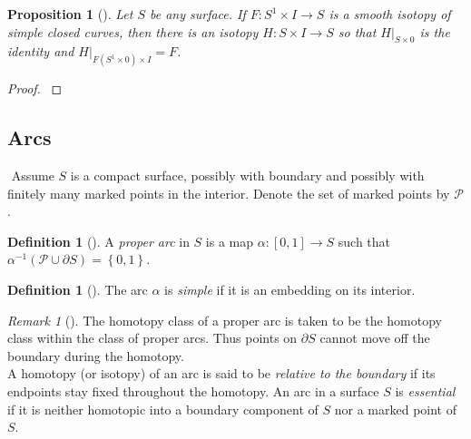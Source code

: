 \documentclass[reqno]{amsart}
\newtheorem{proposition}[theorem]{Proposition}
\theoremstyle{definition}
\newtheorem{definition}[theorem]{Definition}
\theoremstyle{remark}
\newtheorem*{remark}{Remark}
\begin{document}
\begin{proposition}[]
    Let $S$ be any surface. If $F \colon S^{1} \times I \to 
    S$ is a smooth isotopy of simple closed curves, then
    there is an isotopy $H \colon S \times I \to S$ so that
    $H |_{S \times 0}$ is the identity and 
    $H|_{F\left( S^{1} \times 0 \right) \times I} = F$.
\end{proposition}

\begin{proof}
    \cite[Ch~8, Thm 1.3]{Hirsch}
\end{proof}



\subsection*{Arcs}
$ $ \newline \newline
Assume $S$ is a compact surface, possibly with boundary
and possibly with finitely many marked points in the interior.
Denote the set of marked points by $\mathcal{P}$.

\begin{definition}[]
    A \textit{proper arc} in $S$ is a map $\alpha \colon
    \left[ 0,1 \right]  \to S$ such that
    $\alpha^{-1} \left( \mathcal{P} \cup \partial S \right) 
    = \left\{ 0,1 \right\} $.
\end{definition}
\begin{definition}[]
    The arc $\alpha$ is \textit{simple} if it is an embedding
on its interior.
\end{definition}

\begin{remark}[]
    The homotopy class of a proper arc is taken to be
    the homotopy class within the class of proper arcs.
    Thus points on $\partial S$ cannot move off the boundary
    during the homotopy.\\
    A homotopy (or isotopy) of an arc is said to
    be \textit{relative to the boundary} if its endpoints
    stay fixed throughout the homotopy. 
    An arc in a surface $S$ is \textit{essential} if it
    is neither homotopic into a boundary component of $S$ nor a
    marked point of $S$.
\end{remark}
\end{document}
